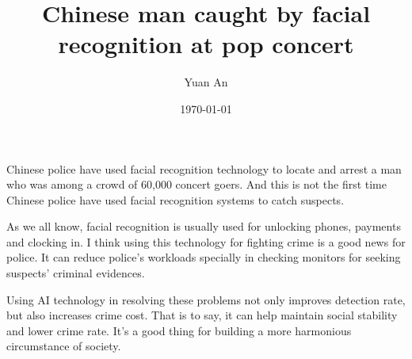 \documentclass[a4paper,12pt]{article}
\title{Chinese man caught by facial recognition at pop concert}
\author{Yuan An}
\date{\today}
\begin{document}
\maketitle
Chinese police have used facial recognition technology to locate and arrest  a man who was among a crowd of 60,000 concert goers. And this is not the  first time Chinese police have used facial recognition systems to catch suspects. 
\par
As we all know, facial recognition is usually used for unlocking phones, payments and clocking in. I think using this technology for fighting crime is a good news for police. It can reduce police's workloads specially in checking monitors for seeking suspects' criminal evidences. 
\par
Using AI technology in resolving these problems  not only improves detection rate, but also increases crime cost. That is to say, it can help maintain social stability and lower crime rate. It's a good thing for building a more harmonious circumstance of society.
\end{document}
